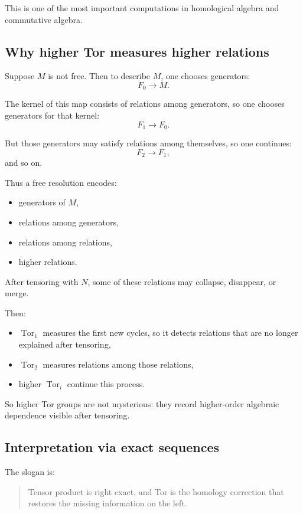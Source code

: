 \documentclass[12pt,a4paper]{article}
\theoremstyle{notespace}
\begin{document}
This is one of the most important computations in homological algebra and commutative algebra.

\subsection{Why higher Tor measures higher relations}

Suppose \(M\) is not free. Then to describe \(M\), one chooses generators:
\[
F_0\to M.
\]

The kernel of this map consists of relations among generators, so one chooses generators for that kernel:
\[
F_1\to F_0.
\]

But those generators may satisfy relations among themselves, so one continues:
\[
F_2\to F_1,
\]
and so on.

Thus a free resolution encodes:

\begin{itemize}
	\item generators of \(M\),
	\item relations among generators,
	\item relations among relations,
	\item higher relations.
\end{itemize}

After tensoring with \(N\), some of these relations may collapse, disappear, or merge.

Then:

\begin{itemize}
	\item \(\operatorname{Tor}_1\) measures the first new cycles, so it detects relations that are no longer explained after tensoring,
	\item \(\operatorname{Tor}_2\) measures relations among those relations,
	\item higher \(\operatorname{Tor}_i\) continue this process.
\end{itemize}

So higher Tor groups are not mysterious: they record higher-order algebraic dependence visible after tensoring.

\subsection{Interpretation via exact sequences}

The slogan is:

\begin{quote}
	Tensor product is right exact, and Tor is the homology correction that restores the missing information on the left.
\end{quote}
\end{document}
